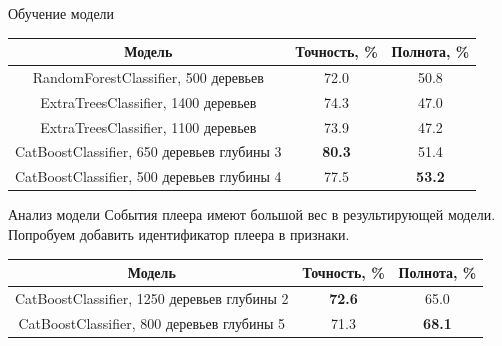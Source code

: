\documentclass{beamer}
\begin{document}


\begin{frame}{Обучение модели}
    \begin{table}
        \centering
        \begin{tabular}{|c|c|c|}
            \hline
            Модель & Точность, \% & Полнота, \% \\
            \hline
            RandomForestClassifier, 500 деревьев & 72.0 & 50.8 \\
            \hline
            ExtraTreesClassifier, 1400 деревьев & 74.3 & 47.0 \\
            \hline
            ExtraTreesClassifier, 1100 деревьев & 73.9 & 47.2 \\
            \hline
            CatBoostClassifier, 650 деревьев глубины 3 & \textbf{80.3} & 51.4 \\
            \hline
            CatBoostClassifier, 500 деревьев глубины 4 & 77.5 & \textbf{53.2} \\
            \hline
        \end{tabular}
    \end{table}
\end{frame}

\begin{frame}{Анализ модели}
    События плеера имеют большой вес в результирующей модели. \\
    Попробуем добавить идентификатор плеера в признаки.
    \begin{table}
        \centering
        \begin{tabular}{|c|c|c|}
            \hline
            Модель & Точность, \% & Полнота, \% \\
            \hline
            CatBoostClassifier, 1250 деревьев глубины 2 & \textbf{72.6} & 65.0 \\
            \hline
            CatBoostClassifier, 800 деревьев глубины 5 & 71.3 & \textbf{68.1} \\
            \hline
        \end{tabular}
    \end{table}
\end{frame}
\end{document}
